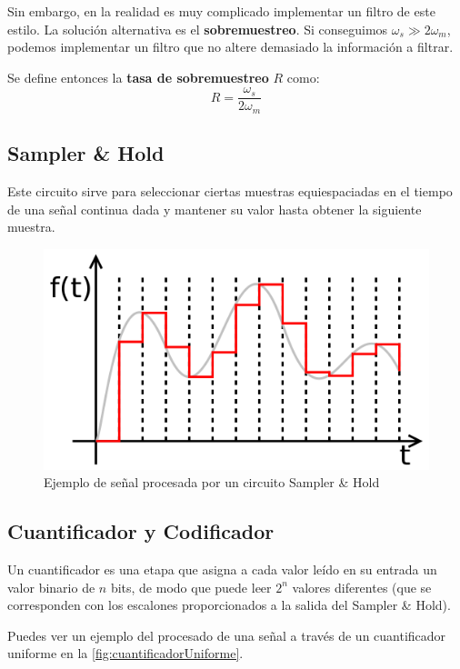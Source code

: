 \documentclass[a4paper,oneside]{book}
\begin{document}
Sin embargo, en la realidad es muy complicado implementar un filtro de este estilo. La solución alternativa es el \textbf{sobremuestreo}. Si conseguimos $\omega_s \gg 2 \omega_m$, podemos implementar un filtro que no altere demasiado la información a filtrar.
	
Se define entonces la \textbf{tasa de sobremuestreo} $R$ como:
\[ R = \frac{\omega_s}{2\omega_m} \]

\subsection{Sampler \& Hold}

Este circuito sirve para seleccionar ciertas muestras equiespaciadas en el tiempo de una señal continua dada y mantener su valor hasta obtener la siguiente muestra.

\begin{figure}[htp] \label{fig:samplerAndHold}
	\centering
	\caption{Ejemplo de señal procesada por un circuito Sampler \& Hold}
	\includegraphics[width=0.8\linewidth]{Imágenes/SamplerAndHold.png}
\end{figure}

\subsection{Cuantificador y Codificador}

Un cuantificador es una etapa que asigna a cada valor leído en su entrada un valor binario de $n$ bits, de modo que puede leer $2^n$ valores diferentes (que se corresponden con los escalones proporcionados a la salida del Sampler \& Hold).

Puedes ver un ejemplo del procesado de una señal a través de un cuantificador uniforme en la \autoref{fig:cuantificadorUniforme}.
\end{document}
